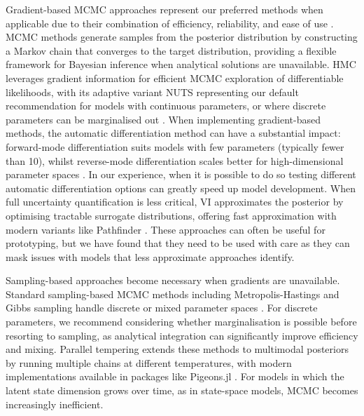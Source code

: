 \documentclass{article}
\begin{document}
Gradient-based \ac{MCMC} approaches represent our preferred methods when applicable due to their combination of efficiency, reliability, and ease of use \citep{gilks1995markov, lekone2006statistical}.
\ac{MCMC} methods generate samples from the posterior distribution by constructing a Markov chain that converges to the target distribution, providing a flexible framework for Bayesian inference when analytical solutions are unavailable.
\ac{HMC} leverages gradient information for efficient \ac{MCMC} exploration of differentiable likelihoods, with its adaptive variant \ac{NUTS} representing our default recommendation for models with continuous parameters, or where discrete parameters can be marginalised out \citep{duane1987hybrid, hoffman2014no, andrade2020evaluation}.
When implementing gradient-based methods, the automatic differentiation method can have a substantial impact: forward-mode differentiation suits models with few parameters (typically fewer than 10), whilst reverse-mode differentiation scales better for high-dimensional parameter spaces \citep{baydin2018automatic, andelfinger2023towards}.
In our experience, when it is possible to do so testing different automatic differentiation options can greatly speed up model development.
When full uncertainty quantification is less critical, \ac{VI} approximates the posterior by optimising tractable surrogate distributions, offering fast approximation with modern variants like Pathfinder \citep{blei2017variational, chatzilena2019contemporary}.
These approaches can often be useful for prototyping, but we have found that they need to be used with care as they can mask issues with models that less approximate approaches identify.

Sampling-based approaches become necessary when gradients are unavailable.
Standard sampling-based \ac{MCMC} methods including Metropolis-Hastings and Gibbs sampling handle discrete or mixed parameter spaces \citep{hastings1970monte, geman1984stochastic, gilks1995markov}.
For discrete parameters, we recommend considering whether marginalisation is possible before resorting to sampling, as analytical integration can significantly improve efficiency and mixing.
Parallel tempering extends these methods to multimodal posteriors by running multiple chains at different temperatures, with modern implementations available in packages like Pigeons.jl \citep{surjanovic2023pigeons}.
For models in which the latent state dimension grows over time, as in state-space models, \ac{MCMC} becomes increasingly inefficient.
\end{document}
